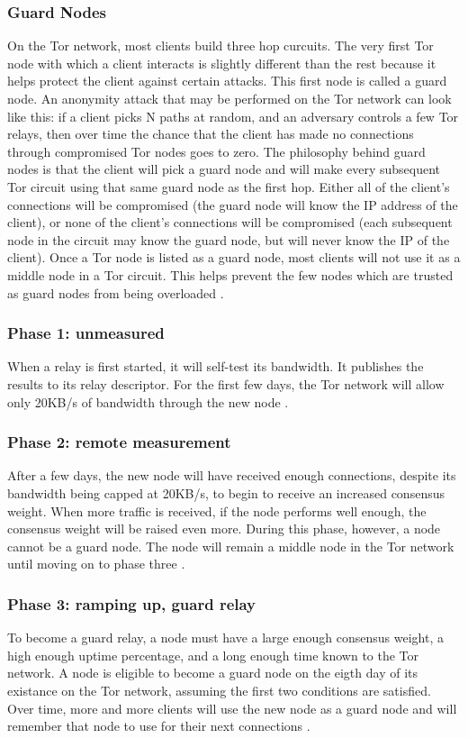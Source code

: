 \documentclass[12pt,journal]{IEEEtran}
\begin{document}
\subsubsection{Guard Nodes}
On the Tor network, most clients build three hop curcuits. The very first Tor node with which a client interacts is slightly different than the rest because it helps protect the client against certain attacks. This first node is called a guard node. An anonymity attack that may be performed on the Tor network can look like this: if a client picks N paths at random, and an adversary controls a few Tor relays, then over time the chance that the client has made no connections through compromised Tor nodes goes to zero. The philosophy behind guard nodes is that the client will pick a guard node and will make every subsequent Tor circuit using that same guard node as the first hop. Either all of the client's connections will be compromised (the guard node will know the IP address of the client), or none of the client's connections will be compromised (each subsequent node in the circuit may know the guard node, but will never know the IP of the client). Once a Tor node is listed as a guard node, most clients will not use it as a middle node in a Tor circuit. This helps prevent the few nodes which are trusted as guard nodes from being overloaded \cite{arma2013}.
\subsubsection{Phase 1: unmeasured}
When a relay is first started, it will self-test its bandwidth. It publishes the results to its relay descriptor. For the first few days, the Tor network will allow only 20KB/s of bandwidth through the new node \cite{arma2013}.
\subsubsection{Phase 2: remote measurement}
After a few days, the new node will have received enough connections, despite its bandwidth being capped at 20KB/s, to begin to receive an increased consensus weight. When more traffic is received, if the node performs well enough, the consensus weight will be raised even more. During this phase, however, a node cannot be a guard node. The node will remain a middle node in the Tor network until moving on to phase three \cite{arma2013}.
\subsubsection{Phase 3: ramping up, guard relay}
To become a guard relay, a node must have a large enough consensus weight, a high enough uptime percentage, and a long enough time known to the Tor network. A node is eligible to become a guard node on the eigth day of its existance on the Tor network, assuming the first two conditions are satisfied. Over time, more and more clients will use the new node as a guard node and will remember that node to use for their next connections \cite{arma2013}.
\end{document}
